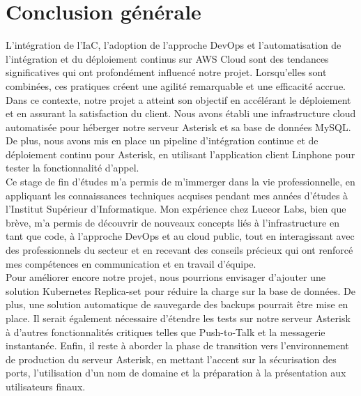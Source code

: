 \chapter*{Conclusion générale}
L'intégration de l'IaC, l'adoption de l'approche DevOps et l'automatisation de l'intégration et du déploiement continus sur AWS Cloud sont des tendances significatives qui ont profondément influencé notre projet. Lorsqu'elles sont combinées, ces pratiques créent une agilité remarquable et une efficacité accrue.
\\

Dans ce contexte, notre projet a atteint son objectif en accélérant le déploiement et en assurant la satisfaction du client. Nous avons établi une infrastructure cloud automatisée pour héberger notre serveur Asterisk et sa base de données MySQL. De plus, nous avons mis en place un pipeline d'intégration continue et de déploiement continu pour Asterisk, en utilisant l'application client Linphone pour tester la fonctionnalité d'appel.
\\

Ce stage de fin d'études m'a permis de m'immerger dans la vie professionnelle, en appliquant les connaissances techniques acquises pendant mes années d'études à l'Institut Supérieur d'Informatique. Mon expérience chez Luceor Labs, bien que brève, m'a permis de découvrir de nouveaux concepts liés à l'infrastructure en tant que code, à l'approche DevOps et au cloud public, tout en interagissant avec des professionnels du secteur et en recevant des conseils précieux qui ont renforcé mes compétences en communication et en travail d'équipe.
\\

Pour améliorer encore notre projet, nous pourrions envisager d'ajouter une solution Kubernetes Replica-set pour réduire la charge sur la base de données. De plus, une solution automatique de sauvegarde des backups pourrait être mise en place. Il serait également nécessaire d'étendre les tests sur notre serveur Asterisk à d'autres fonctionnalités critiques telles que Push-to-Talk et la messagerie instantanée. Enfin, il reste à aborder la phase de transition vers l'environnement de production du serveur Asterisk, en mettant l'accent sur la sécurisation des ports, l'utilisation d'un nom de domaine et la préparation à la présentation aux utilisateurs finaux.
